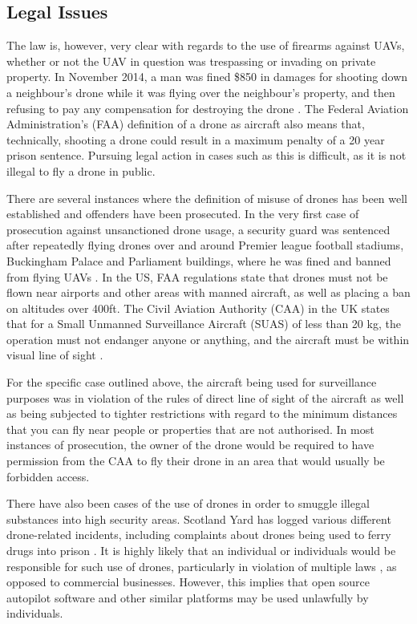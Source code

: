 \subsection{Legal Issues}
The law is, however, very clear with regards to the use of firearms against UAVs, whether or not the UAV in question was trespassing or invading on private property. In November 2014, a man was fined \$850 in damages for shooting down a neighbour’s drone while it was flying over the neighbour's property, and then refusing to pay any compensation for destroying the drone \cite{colinneagle2015}. The Federal Aviation Administration’s (FAA) definition of a drone as aircraft also means that, technically, shooting a drone could result in a maximum penalty of a 20 year prison sentence. Pursuing legal action in cases such as this is difficult, as it is not illegal to fly a drone in public. 

There are several instances where the definition of misuse of drones has been well established and offenders have been prosecuted. In the very first case of prosecution against unsanctioned drone usage, a security guard was sentenced after repeatedly flying drones over and around Premier league football stadiums, Buckingham Palace and Parliament buildings, where he was fined and banned from flying UAVs \cite{maryannrusson2015}.  In the US, FAA regulations state that drones must not be flown near airports and other areas with manned aircraft, as well as placing a ban on altitudes over 400ft. The Civil Aviation Authority (CAA) in the UK states that for a Small Unmanned Surveillance Aircraft (SUAS) of less than 20 kg, the operation must not endanger anyone or anything, and the aircraft must be within visual line of sight \cite{civilaviationauthority2015}.

For the specific case outlined above, the aircraft being used for surveillance purposes was in violation of the rules of direct line of sight of the aircraft as well as being subjected to tighter restrictions with regard to the minimum distances that you can fly near people or properties that are not authorised. In most instances of prosecution, the owner of the drone would be required to have permission from the CAA to fly their drone in an area that would usually be forbidden access.

There have also been cases of the use of drones in order to smuggle illegal substances into high security areas. Scotland Yard has logged various different drone-related incidents, including complaints about drones being used to ferry drugs into prison \cite{maryannrusson2015}.  It is highly likely that an individual or individuals would be responsible for such use of drones, particularly in violation of multiple laws \cite{civilaviationauthority2015}, as opposed to commercial businesses. However, this implies that open source autopilot software and other similar platforms may be used unlawfully by individuals.

